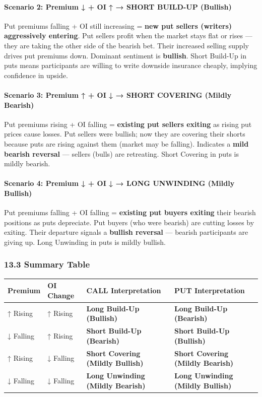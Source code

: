 \documentclass[12pt,openany]{book}
\begin{document}
\paragraph{Scenario 2: Premium ↓ + OI ↑ → SHORT BUILD-UP (Bullish)}

Put premiums falling + OI still increasing = \textbf{new put sellers (writers) aggressively entering}. Put sellers profit when the market stays flat or rises — they are taking the other side of the bearish bet. Their increased selling supply drives put premiums down. Dominant sentiment is \textbf{bullish}. Short Build-Up in puts means participants are willing to write downside insurance cheaply, implying confidence in upside.

\paragraph{Scenario 3: Premium ↑ + OI ↓ → SHORT COVERING (Mildly Bearish)}

Put premiums rising + OI falling = \textbf{existing put sellers exiting} as rising put prices cause losses. Put sellers were bullish; now they are covering their shorts because puts are rising against them (market may be falling). Indicates a \textbf{mild bearish reversal} — sellers (bulls) are retreating. Short Covering in puts is mildly bearish.

\paragraph{Scenario 4: Premium ↓ + OI ↓ → LONG UNWINDING (Mildly Bullish)}

Put premiums falling + OI falling = \textbf{existing put buyers exiting} their bearish positions as puts depreciate. Put buyers (who were bearish) are cutting losses by exiting. Their departure signals a \textbf{bullish reversal} — bearish participants are giving up. Long Unwinding in puts is mildly bullish.

\subsubsection{13.3 Summary Table}

\begin{center}
\scriptsize
\setlength{\tabcolsep}{3pt}
\begin{tabular}{|L{3.30cm}|L{3.30cm}|L{3.30cm}|L{3.30cm}|}
\hline
Premium & OI Change & CALL Interpretation & PUT Interpretation \\
\hline
↑ Rising & ↑ Rising & \textbf{Long Build-Up (Bullish)} & \textbf{Long Build-Up (Bearish)} \\
\hline
↓ Falling & ↑ Rising & \textbf{Short Build-Up (Bearish)} & \textbf{Short Build-Up (Bullish)} \\
\hline
↑ Rising & ↓ Falling & \textbf{Short Covering (Mildly Bullish)} & \textbf{Short Covering (Mildly Bearish)} \\
\hline
↓ Falling & ↓ Falling & \textbf{Long Unwinding (Mildly Bearish)} & \textbf{Long Unwinding (Mildly Bullish)} \\
\hline
\end{tabular}
\end{center}
\end{document}
